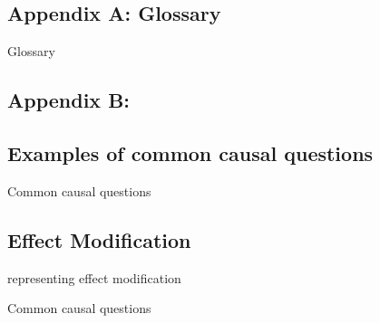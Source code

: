 \documentclass[
  single column]{article}
\begin{document}
\newpage{}

\subsection{Appendix A: Glossary}\label{appendix-a-glossary}

\begin{table}

\caption{\label{tbl-experiments}Glossary}

\centering{

\glossaryTerms

}

\end{table}%

\subsection{Appendix B:}\label{appendix-b}

\subsection{Examples of common causal
questions}\label{examples-of-common-causal-questions}

\begin{table}

\caption{\label{tbl-common-interests}Common causal questions}

\centering{

\terminologycommoncausalinterests

}

\end{table}%

\subsection{Effect Modification}\label{effect-modification}

\begin{table}

\caption{\label{tbl-common-interests}representing effect modification}

\centering{

\terminologyeffectmodification

}

\end{table}%

\begin{table}

\caption{\label{tbl-common-interests}Common causal questions}

\centering{

\terminologyeffectmodificationtypes

}

\end{table}%
\end{document}
